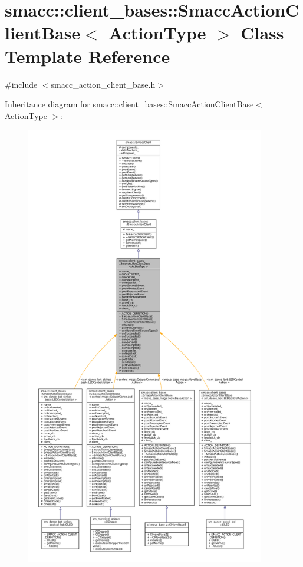 \hypertarget{classsmacc_1_1client__bases_1_1SmaccActionClientBase}{}\section{smacc\+:\+:client\+\_\+bases\+:\+:Smacc\+Action\+Client\+Base$<$ Action\+Type $>$ Class Template Reference}
\label{classsmacc_1_1client__bases_1_1SmaccActionClientBase}


{\ttfamily \#include $<$smacc\+\_\+action\+\_\+client\+\_\+base.\+h$>$}



Inheritance diagram for smacc\+:\+:client\+\_\+bases\+:\+:Smacc\+Action\+Client\+Base$<$ Action\+Type $>$\+:
\nopagebreak
\begin{figure}[H]
\begin{center}
\leavevmode
\includegraphics[height=550pt]{classsmacc_1_1client__bases_1_1SmaccActionClientBase__inherit__graph}
\end{center}
\end{figure}


